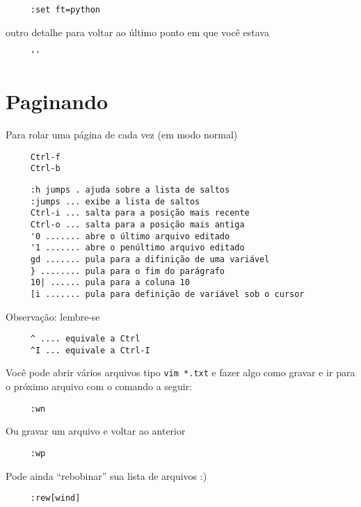 \begin{verbatim}
     :set ft=python
\end{verbatim}

outro detalhe para voltar ao último ponto em que você estava

\begin{verbatim}
     ''
\end{verbatim}

\section{Paginando}
\label{Paginando}

Para rolar uma página de cada vez (em modo normal)

\begin{verbatim}
     Ctrl-f
     Ctrl-b
\end{verbatim}


\begin{verbatim}
     :h jumps . ajuda sobre a lista de saltos
     :jumps ... exibe a lista de saltos
     Ctrl-i ... salta para a posição mais recente
     Ctrl-o ... salta para a posição mais antiga
     '0 ....... abre o último arquivo editado
     '1 ....... abre o penúltimo arquivo editado
     gd ....... pula para a difinição de uma variável
     } ........ pula para o fim do parágrafo
     10| ...... pula para a coluna 10
     [i ....... pula para definição de variável sob o cursor
\end{verbatim}

Observação: lembre-se

\begin{verbatim}
     ^ .... equivale a Ctrl
     ^I ... equivale a Ctrl-I
\end{verbatim}

Você pode abrir vários arquivos tipo \verb|vim *.txt| e fazer
algo como gravar e ir para o próximo arquivo com o comando a
seguir:

\begin{verbatim}
     :wn
\end{verbatim}

Ou gravar um arquivo e voltar ao anterior

\begin{verbatim}
     :wp
\end{verbatim}

Pode ainda ``rebobinar'' sua lista de arquivos :)

\begin{verbatim}
     :rew[wind]
\end{verbatim}


